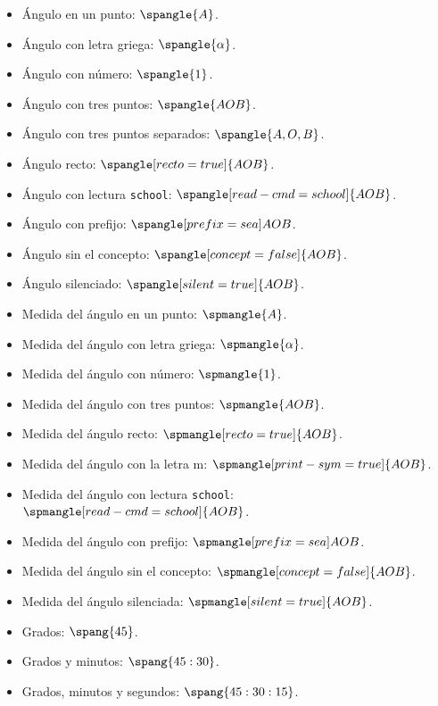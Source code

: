 \documentclass{article}
\begin{document}
\begin{itemize}
  \item Ángulo en un punto: $\spangle{A}$.
  \item Ángulo con letra griega: $\spangle{\alpha}$.
  \item Ángulo con número: $\spangle{1}$.
  \item Ángulo con tres puntos: $\spangle{AOB}$.
  \item Ángulo con tres puntos separados: $\spangle{A,O,B}$.
  \item Ángulo recto: $\spangle[recto=true]{AOB}$.
  \item Ángulo con lectura \texttt{school}: $\spangle[read-cmd=school]{AOB}$.
  \item Ángulo con prefijo: $\spangle[prefix={sea}]{AOB}$.
  \item Ángulo sin el concepto: $\spangle[concept=false]{AOB}$.
  \item Ángulo silenciado: $\spangle[silent=true]{AOB}$.
  \item Medida del ángulo en un punto: $\spmangle{A}$.
  \item Medida del ángulo con letra griega: $\spmangle{\alpha}$.
  \item Medida del ángulo con número: $\spmangle{1}$.
  \item Medida del ángulo con tres puntos: $\spmangle{AOB}$.
  \item Medida del ángulo recto: $\spmangle[recto=true]{AOB}$.
  \item Medida del ángulo con la letra m: $\spmangle[print-sym=true]{AOB}$.
  \item Medida del ángulo con lectura \texttt{school}: $\spmangle[read-cmd=school]{AOB}$.
  \item Medida del ángulo con prefijo: $\spmangle[prefix={sea}]{AOB}$.
  \item Medida del ángulo sin el concepto: $\spmangle[concept=false]{AOB}$.
  \item Medida del ángulo silenciada: $\spmangle[silent=true]{AOB}$.
  \item Grados: $\spang{45}$.
  \item Grados y minutos: $\spang{45:30}$.
  \item Grados, minutos y segundos: $\spang{45:30:15}$.
\end{itemize}
\end{document}
